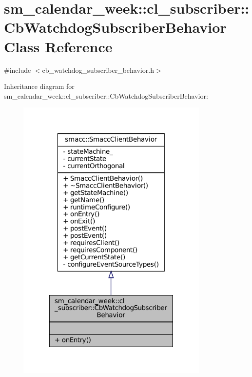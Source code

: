 \hypertarget{classsm__calendar__week_1_1cl__subscriber_1_1CbWatchdogSubscriberBehavior}{}\section{sm\+\_\+calendar\+\_\+week\+:\+:cl\+\_\+subscriber\+:\+:Cb\+Watchdog\+Subscriber\+Behavior Class Reference}
\label{classsm__calendar__week_1_1cl__subscriber_1_1CbWatchdogSubscriberBehavior}


{\ttfamily \#include $<$cb\+\_\+watchdog\+\_\+subscriber\+\_\+behavior.\+h$>$}



Inheritance diagram for sm\+\_\+calendar\+\_\+week\+:\+:cl\+\_\+subscriber\+:\+:Cb\+Watchdog\+Subscriber\+Behavior\+:
\nopagebreak
\begin{figure}[H]
\begin{center}
\leavevmode
\includegraphics[width=270pt]{classsm__calendar__week_1_1cl__subscriber_1_1CbWatchdogSubscriberBehavior__inherit__graph}
\end{center}
\end{figure}


